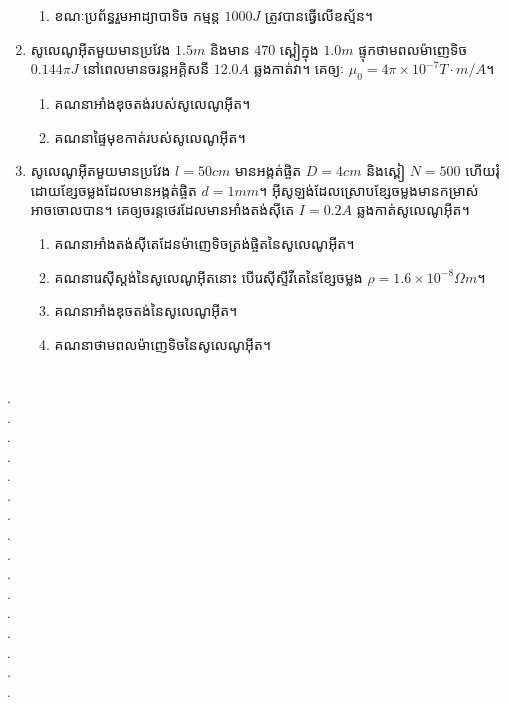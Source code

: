 \documentclass{officialexam}
\begin{document}
\begin{enumerate}[I]
\begin{enumerate}[k]
		\item ខណៈប្រព័ន្ធរួមអាដ្យាបាទិច កម្មន្ត $1000J$ ត្រូវបានធ្វើលើឧស្ម័ន។
	\end{enumerate}
	\item សូលេណូអុីតមួយមានប្រវែង $1.5m$ និងមាន $470$ ស្ពៀក្នុង $1.0m$ ផ្ទុកថាមពលម៉ាញេទិច $0.144\pi J$ នៅពេលមានចរន្តអគ្គិសនី $12.0A$ ឆ្លងកាត់វា។ គេឲ្យៈ $\mu_0=4\pi\times10^{-7}T\cdot m/A$។
	\begin{enumerate}[k,2]
		\item គណនាអាំងឌុចតង់របស់សូលេណូអុីត។
		\item គណនាផ្ទៃមុខកាត់របស់សូលេណូអុីត។
	\end{enumerate}
	\item សូលេណូអុីតមួយមានប្រវែង $l=50cm$ មានអង្កត់ផ្ចិត $D=4cm$ និងស្ពៀ $N=500$ ហើយរុំដោយខ្សែចម្លងដែលមានអង្កត់ផ្ចិត $d=1mm$។ អុីសូឡង់ដែលស្រោបខ្សែចម្លងមានកម្រាស់អាចចោលបាន។ គេឲ្យចរន្តថេរដែលមានអាំងតង់សុីតេ $I=0.2A$ ឆ្លងកាត់សូលេណូអុីត។
	\begin{enumerate}[k]
		\item គណនាអាំងតង់សុីតេដែនម៉ាញេទិចត្រង់ផ្ចិតនៃសូលេណូអុីត។
		\item គណនារេសុីស្តង់នៃសូលេណូអុីតនោះ បើរេសុីស្ទីវីតេនៃខ្សែចម្លង $\rho=1.6\times10^{-8}\Omega m$។
		\item គណនាអាំងឌុចតង់នៃសូលេណូអុីត។
		\item គណនាថាមពលម៉ាញេទិចនៃសូលេណូអុីត។
	\end{enumerate}
\end{enumerate}\newpage
{}\\
{\color{white}.}\dotfill\\
{\color{white}.}\dotfill\\
{\color{white}.}\dotfill
\\
{\color{white}.}\dotfill\\
{\color{white}.}\dotfill\\
{\color{white}.}\dotfill
\\
{\color{white}.}\dotfill\\
{\color{white}.}\dotfill\\
{\color{white}.}\dotfill
\\
{\color{white}.}\dotfill\\
{\color{white}.}\dotfill\\
{\color{white}.}\dotfill
\\
{\color{white}.}\dotfill\\
{\color{white}.}\dotfill\\
{\color{white}.}\dotfill
\\
{\color{white}.}\dotfill\\
\end{document}
